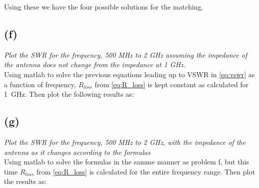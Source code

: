 Using these we have the four possible solutions for the matching. 

\subsection{(f)}
\textit{Plot the SWR for the frequency, 500 MHz to 2 GHz assuming the impedance of the antenna does not
change from the impedance at 1 GHz.}\\

Using matlab to solve the previous equations leading up to VSWR in \eqref{eq:vswr} as a function of frequency, $R_{loss}$ from \eqref{eq:R_loss} is kept constant as calculated for \SI{1}{\giga\hertz}. Then plot the following results as:

\subsection{(g)}
\textit{Plot the SWR for the frequency, 500 MHz to 2 GHz, with the impedance of the antenna as it changes
according to the formulas}\\

Using matlab to solve the formulas in the samme manner as problem f, but this time $R_{loss}$ from \eqref{eq:R_loss} is calculated for the entire frequency range. Then plot the results as:
